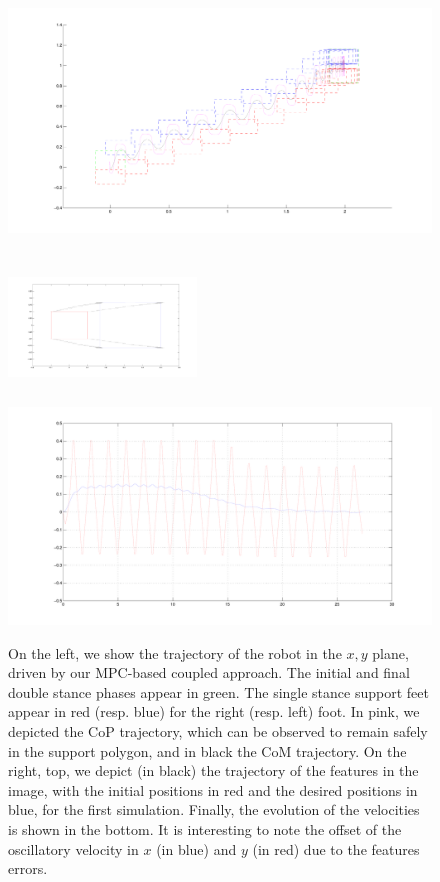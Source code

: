 \begin{figure}[h]
\begin{minipage}{0.5\textwidth}
 \centering
 \includegraphics[scale=.25]{Chap4-Visual-Servoing/steps1_hrp2.pdf}
\end{minipage}
\begin{minipage}{0.5\textwidth}
 \centering
 \includegraphics[width=5cm,height=4cm]{Chap4-Visual-Servoing/features1_hrp2.pdf}
\\
 \includegraphics[scale=.2]{Chap4-Visual-Servoing/vels1_hrp2.pdf}
\end{minipage}
 \caption[]{\label{Fig:Results1}\small{On the left, we show the trajectory of the robot in the $x,y$ plane, driven by our MPC-based coupled approach. The initial and final double stance phases appear in green. The single stance support feet appear in red (resp. blue) for the right (resp. left) foot. In pink, we depicted the CoP trajectory, which can be observed to remain safely in the support polygon, and in black the CoM trajectory. On the right, top, we depict (in black) the trajectory of the features in the image, with the initial positions in red and the desired positions in blue, for the first simulation.  Finally, the evolution of the velocities is shown in the bottom. It is interesting to note the offset of the oscillatory velocity in $x$ (in blue) and $y$ (in red) due to the features errors.}}
 \end{figure}


